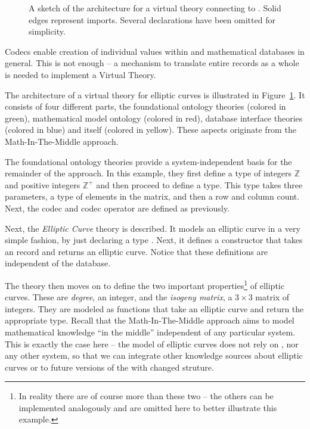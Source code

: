 \begin{figure}[ht]
{
    }
    \endgroup
  \caption[Virtual Theory Architecture]{
    A sketch of the architecture for a virtual theory connecting to \lmfdb. 
    Solid edges represent imports. 
    Several declarations have been omitted for simplicity. 
  }
  \label{fig:vtarch}
\end{figure}

Codecs enable creation of individual values within \lmfdb and mathematical databases in general. 
This is not enough -- a mechanism to translate entire records as a whole is needed to implement a Virtual Theory. 

The architecture of a virtual theory for \lmfdb elliptic curves is illustrated in Figure~\ref{fig:vtarch}. 
It consists of four different parts, the foundational ontology theories (colored in green), mathematical model ontology (colored in red), database interface theories (colored in blue) and \lmfdb itself (colored in yellow). 
These aspects originate from the Math-In-The-Middle approach. 

The foundational ontology theories provide a system-independent basis for the remainder of the approach. 
In this example, they first define a type of integers $\mathbb{Z}$ and positive integers $\mathbb{Z}^{+}$ and then proceed to define a  type. 
This type takes three parameters, a type of elements in the matrix, and then a row and column count. 
Next, the codec  and codec operator  are defined as previously. 

Next, the \textit{Elliptic Curve} theory is described. 
It models an elliptic curve in a very simple fashion, by just declaring a type . 
Next, it defines a  constructor that takes an \mmt record and returns an elliptic curve. 
Notice that these definitions are independent of the \lmfdb database. 

The theory then moves on to define the two important properties\footnote{In reality there
  are of course more than these two -- the others can be implemented analogously and are
  omitted here to better illustrate this example.} of elliptic curves.  These are
\textit{degree}, an integer, and the \textit{isogeny matrix}, a $3 \times 3$ matrix of
integers. They are modeled as functions that take an elliptic curve and return the
appropriate type.  Recall that the Math-In-The-Middle approach aims to model mathematical
knowledge ``in the middle'' independent of any particular system.  This is exactly the
case here -- the model of elliptic curves does not rely on \lmfdb, nor any other system,
so that we can integrate other knowledge sources about elliptic curves or to future
versions of the \lmfdb with changed struture.

